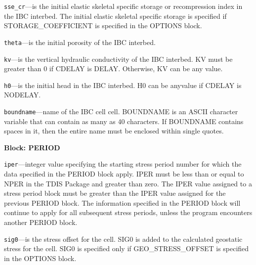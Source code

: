 \begin{description}
\item \texttt{sse\_cr}---is the initial elastic skeletal specific storage or recompression index in the IBC interbed. The initial elastic skeletal specific storage is specified if STORAGE\_COEFFICIENT is specified in the OPTIONS block.

\item \texttt{theta}---is the initial porosity of the IBC interbed.

\item \texttt{kv}---is the vertical hydraulic conductivity of the IBC interbed. KV must be greater than 0 if CDELAY is DELAY. Otherwise, KV can be any value.

\item \texttt{h0}---is the initial head in the IBC interbed. H0 can be anyvalue if CDELAY is NODELAY.

\item \texttt{boundname}---name of the IBC cell cell.  BOUNDNAME is an ASCII character variable that can contain as many as 40 characters.  If BOUNDNAME contains spaces in it, then the entire name must be enclosed within single quotes.

\end{description}
\item \textbf{Block: PERIOD}

\begin{description}
\item \texttt{iper}---integer value specifying the starting stress period number for which the data specified in the PERIOD block apply.  IPER must be less than or equal to NPER in the TDIS Package and greater than zero.  The IPER value assigned to a stress period block must be greater than the IPER value assigned for the previous PERIOD block.  The information specified in the PERIOD block will continue to apply for all subsequent stress periods, unless the program encounters another PERIOD block.

\item \texttt{sig0}---is the stress offset for the cell. SIG0 is added to the calculated geostatic stress for the cell. SIG0 is specified only if GEO\_STRESS\_OFFSET is specified in the OPTIONS block.

\end{description}

